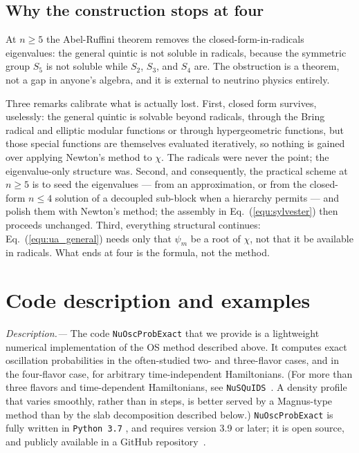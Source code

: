 \documentclass[final,5p,times,twocolumn]{elsarticle}
\newcommand{\eq}{Eq.}
\newcommand{\equ}[1]{\eq~(\ref{equ:#1})}
\providecommand{\DIFaddtex}[1]{{\protect\color{blue} \sf #1}} %
\providecommand{\DIFdeltex}[1]{{\protect\color{red} \scriptsize #1}} %
\providecommand{\DIFaddbegin}{} %
\providecommand{\DIFaddend}{} %
\providecommand{\DIFdelbegin}{} %
\providecommand{\DIFdelend}{} %
\providecommand{\DIFadd}[1]{\DIFaddtex{#1}} %
\providecommand{\DIFdel}[1]{\DIFdeltex{#1}} %
\begin{document}
\subsection{\DIFadd{Why the construction stops at four}}
\label{section:beyond_four}

\DIFadd{At $n \geq 5$ the Abel-Ruffini theorem removes the closed-form-in-radicals eigenvalues: the general quintic is not soluble in radicals, because the symmetric group $S_5$ is not soluble while $S_2$, $S_3$, and $S_4$ are.  The obstruction is a theorem, not a gap in anyone's algebra, and it is external to neutrino physics entirely.
}

\DIFadd{Three remarks calibrate what is actually lost.  First, closed form survives, uselessly: the general quintic is solvable beyond radicals, through the Bring radical and elliptic modular functions or through hypergeometric functions, but those special functions are themselves evaluated iteratively, so nothing is gained over applying Newton's method to $\chi$.  The radicals were never the point; the eigenvalue-only structure was.  Second, and consequently, the practical scheme at $n \geq 5$ is to seed the eigenvalues --- from an approximation, or from the closed-form $n \leq 4$ solution of a decoupled sub-block when a hierarchy permits --- and polish them with Newton's method; the assembly in \equ{sylvester} then proceeds unchanged.  Third, everything structural continues: \equ{ua_general} needs only that $\psi_m$ be a root of $\chi$, not that it be available in radicals.  What ends at four is the formula, not the method.
}




\DIFaddend \section{Code description and examples}
\label{section:code}

{\it Description.---}  The code {\tt NuOscProbExact} that we provide is a lightweight numerical implementation of the OS method described above.  It computes exact oscillation probabilities in the often-studied two- and three-flavor cases, \DIFaddbegin \DIFadd{and in the four-flavor case, }\DIFaddend for arbitrary time-independent Hamiltonians.  (For \DIFdelbegin \DIFdel{more than three flavors and }\DIFdelend time-dependent Hamiltonians, see {\tt NuSQuIDS}\ \cite{NuSQuIDS}.  \DIFaddbegin \DIFadd{A density profile that varies smoothly, rather than in steps, is better served by a Magnus-type method than by the slab decomposition described below.}\DIFaddend )   {\tt NuOscProbExact} is fully written in {\tt Python\DIFdelbegin \DIFdel{3.7}\DIFdelend }\DIFaddbegin \DIFadd{, and requires version 3.9 or later}\DIFaddend ; it is open source, and publicly available in a GitHub repository\ \cite{NuOscProbExact}.
\end{document}
